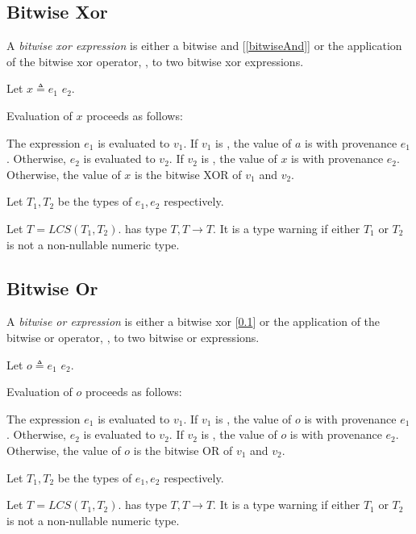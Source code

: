 \documentclass{article}
\begin{document}
{\BitwiseAndExpression{}

\subsection{\space Bitwise Xor}
\label{bitwiseXor}

A {\em bitwise xor expression} is either a bitwise and [\ref{bitwiseAnd}] or the application of the bitwise xor operator, \XOR{}, to two bitwise xor expressions.

Let $x \triangleq e_1$ \XOR{} $e_2$.

Evaluation of $x$ proceeds as follows:

The expression $e_1$ is evaluated to $v_1$.  If  $v_1$ is \NULL{}, the value of $a$ is \NULL{} with provenance $e_1$. Otherwise, $e_2$ is evaluated to $v_2$. If  $v_2$ is \NULL{}, the value of $x$ is \NULL{} with provenance $e_2$. Otherwise, the value of $x$ is the bitwise XOR of $v_1$ and $v_2$.

Let $T_1, T_2$ be the types of $e_1, e_2$ respectively.  

Let $T = LCS(T_1, T_2)$. \XOR{} has type $T, T \to T$. 
It is a type warning if either $T_1$ or $T_2$ is not a non-nullable numeric type.


\BitwiseXorExpression{}

\subsection{\space Bitwise Or}
\label{bitwiseOr}

A {\em bitwise or expression} is either a bitwise xor [\ref{bitwiseXor}] or the application of the bitwise or operator, \BOR{}, to two bitwise or expressions.

Let $o \triangleq e_1$ \BOR{} $e_2$.

Evaluation of $o$ proceeds as follows:

The expression $e_1$ is evaluated to $v_1$.  If  $v_1$ is \NULL{}, the value of $o$ is \NULL{} with provenance $e_1$. Otherwise, $e_2$ is evaluated to $v_2$. If  $v_2$ is \NULL{}, the value of $o$ is \NULL{} with provenance $e_2$. Otherwise, the value of $o$ is the bitwise OR of $v_1$ and $v_2$.

Let $T_1, T_2$ be the types of $e_1, e_2$ respectively.  

Let $T = LCS(T_1, T_2)$. \BOR{} has type $T, T \to T$. 
It is a type warning if either $T_1$ or $T_2$ is not a non-nullable numeric type.


\BitwiseOrExpression{}

}
\end{document}
